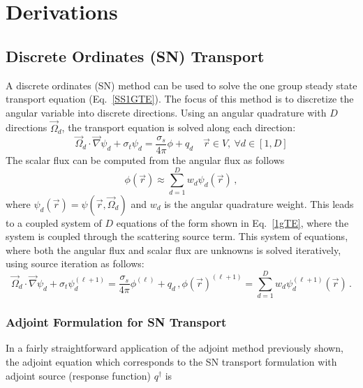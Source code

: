 \documentclass[12pt]{report}
\newcommand{\vr}{\vec{r}}
\newcommand{\vO}{\vec{\Omega}}
\newcommand{\grad}{\vec{\nabla}}
\newcommand{\sigt}{\sigma_t}
\newcommand{\sigs}{\sigma_s}
\newcommand{\angResp}{q^\dag}
\begin{document}


\chapter{Derivations}
\section{Discrete Ordinates (SN) Transport}
A discrete ordinates (SN) method can be used to solve the one group steady state transport equation (Eq.~\eqref{SS1GTE}). The focus of this method is to discretize the angular variable into discrete directions. Using an angular quadrature with $D$ directions $\vO_d$, the transport equation is solved along each direction:
\begin{equation}
\label{1gTE}
\vO_d \cdot \grad \psi_d + \sigt \psi_d = \frac{\sigs}{4 \pi} \phi + q_d \quad \vr \in V ,\  \forall d\in [1,D]
\end{equation}
%
The scalar flux can be computed from the angular flux as follows
\[
\phi(\vr) \approx \sum_{d=1}^D w_d \psi_d(\vr) \,,
\] 
where $\psi_d(\vr) = \psi(\vr, \vO_d)$ and $w_d$ is the angular quadrature weight. This leads to a coupled system of $D$ equations of the form shown in Eq.~\eqref{1gTE}, where the system is coupled through the scattering source term. This system of equations, where both 
the angular flux and scalar flux are unknowns is solved iteratively, using source iteration as follows:
\begin{subequations}
\begin{equation}
\label{1gTE}
\vO_d \cdot \grad \psi_d + \sigt \psi_d^{(\ell+1)} = \frac{\sigs}{4 \pi} \phi^{(\ell)} + q_d \,,
\end{equation}
\begin{equation}
\phi(\vr)^{(\ell+1)} = \sum_{d=1}^D w_d \psi_d^{(\ell+1)}(\vr) \,.
\end{equation}
\end{subequations}




\subsection{Adjoint Formulation for SN Transport}
In a fairly straightforward application of the adjoint method previously shown, the adjoint equation which corresponds to the SN transport formulation with adjoint source (response function)
$\angResp$ is
\end{document}
